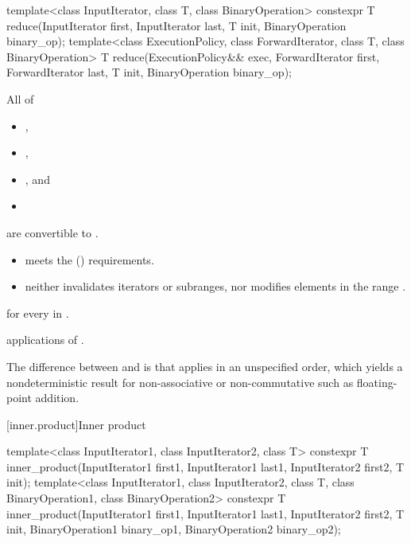 %
\begin{itemdecl}
template<class InputIterator, class T, class BinaryOperation>
  constexpr T reduce(InputIterator first, InputIterator last, T init,
                     BinaryOperation binary_op);
template<class ExecutionPolicy, class ForwardIterator, class T, class BinaryOperation>
  T reduce(ExecutionPolicy&& exec,
           ForwardIterator first, ForwardIterator last, T init,
           BinaryOperation binary_op);
\end{itemdecl}

\begin{itemdescr}

\pnum
\mandates
All of
\begin{itemize}
\item {},
\item {},
\item {}, and
\item {}
\end{itemize}
are convertible to .

\pnum
\expects
\begin{itemize}
\item
   meets the  () requirements.
\item
   neither invalidates iterators or subranges,
  nor modifies elements in the range .
\end{itemize}

\pnum
\returns
{}
for every  in .

\pnum
\complexity
{} applications of .

\pnum
\begin{note}
The difference between  and  is that
 applies  in an unspecified order,
which yields a nondeterministic result
for non-associative or non-commutative 
such as floating-point addition.
\end{note}
\end{itemdescr}

[inner.product]{Inner product}

%
\begin{itemdecl}
template<class InputIterator1, class InputIterator2, class T>
  constexpr T inner_product(InputIterator1 first1, InputIterator1 last1,
                            InputIterator2 first2, T init);
template<class InputIterator1, class InputIterator2, class T,
         class BinaryOperation1, class BinaryOperation2>
  constexpr T inner_product(InputIterator1 first1, InputIterator1 last1,
                            InputIterator2 first2, T init,
                            BinaryOperation1 binary_op1,
                            BinaryOperation2 binary_op2);
\end{itemdecl}

